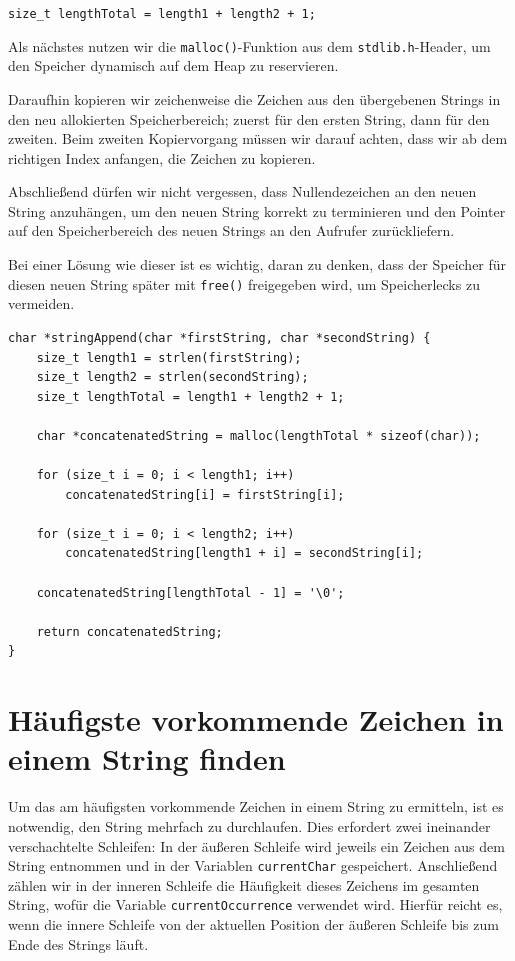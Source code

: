 \texttt{size_t lengthTotal = length1 + length2 + 1;}

Als nächstes nutzen wir die \texttt{malloc()}-Funktion aus dem
\texttt{stdlib.h}-Header, um den Speicher dynamisch auf dem Heap zu
reservieren.

Daraufhin kopieren wir zeichenweise die Zeichen aus den übergebenen Strings in
den neu allokierten Speicherbereich; zuerst für den ersten String, dann für den
zweiten. Beim zweiten Kopiervorgang müssen wir darauf achten, dass wir ab dem
richtigen Index anfangen, die Zeichen zu kopieren.

Abschließend dürfen wir nicht vergessen, dass Nullendezeichen an den neuen
String anzuhängen, um den neuen String korrekt zu terminieren und den Pointer
auf den Speicherbereich des neuen Strings an den Aufrufer zurückliefern.

Bei einer Lösung wie dieser ist es wichtig, daran zu denken, dass der Speicher
für diesen neuen String später mit \texttt{free()} freigegeben wird, um
Speicherlecks zu vermeiden.

\begin{verbatim}
char *stringAppend(char *firstString, char *secondString) {
    size_t length1 = strlen(firstString);
    size_t length2 = strlen(secondString);
    size_t lengthTotal = length1 + length2 + 1;

    char *concatenatedString = malloc(lengthTotal * sizeof(char));

    for (size_t i = 0; i < length1; i++)
        concatenatedString[i] = firstString[i];

    for (size_t i = 0; i < length2; i++)
        concatenatedString[length1 + i] = secondString[i];

    concatenatedString[lengthTotal - 1] = '\0';

    return concatenatedString;
}
\end{verbatim}





\chapter{Häufigste vorkommende Zeichen in einem String finden}

Um das am häufigsten vorkommende Zeichen in einem String zu ermitteln, ist es
notwendig, den String mehrfach zu durchlaufen. Dies erfordert zwei ineinander
verschachtelte Schleifen: In der äußeren Schleife wird jeweils ein Zeichen aus
dem String entnommen und in der Variablen \texttt{currentChar}
gespeichert. Anschließend zählen wir in der inneren Schleife die Häufigkeit
dieses Zeichens im gesamten String, wofür die Variable
\texttt{currentOccurrence} verwendet wird. Hierfür reicht es, wenn die
innere Schleife von der aktuellen Position der äußeren Schleife bis zum Ende des
Strings läuft.

